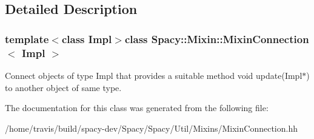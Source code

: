 \subsection{Detailed Description}
\subsubsection*{template$<$class Impl$>$class Spacy\-::\-Mixin\-::\-Mixin\-Connection$<$ Impl $>$}

Connect objects of type Impl that provides a suitable method void update(\-Impl$\ast$) to another object of same type. 

The documentation for this class was generated from the following file\-:\begin{DoxyCompactItemize}
\item 
/home/travis/build/spacy-\/dev/\-Spacy/\-Spacy/\-Util/\-Mixins/Mixin\-Connection.\-hh\end{DoxyCompactItemize}
